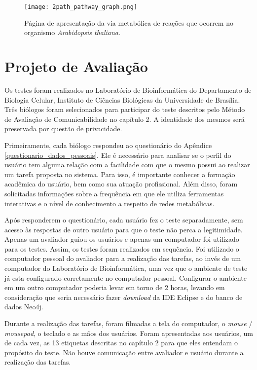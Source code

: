 \begin{figure}[!h]
    \centering
    \texttt{[image: 2path\_pathway\_graph.png]}
    \caption{Página de apresentação da via metabólica de reações que ocorrem no organismo \textit{Arabidopsis thaliana}.}
    \label{fig:2path_pathway_graph}
\end{figure}

\section{Projeto de Avaliação} \label{avaliacao}

\indent Os testes foram realizados no Laboratório de Bioinformática do Departamento de Biologia Celular, Instituto de Ciências Biológicas da Universidade de Brasília. Três biólogos foram selecionados para participar do teste descritos pelo Método de Avaliação de Comunicabilidade no capítulo 2. A identidade dos mesmos será preservada por questão de privacidade.

\indent Primeiramente, cada biólogo respondeu ao questionário do Apêndice \ref{questionario_dados_pessoais}. Ele é necessário para analisar se o perfil do usuário tem alguma relação com a facilidade com que o mesmo possui ao realizar um tarefa proposta no sistema. Para isso, é importante conhecer a formação acadêmica do usuário, bem como sua atuação profissional. Além disso, foram solicitadas informações sobre a frequência em que ele utiliza ferramentas interativas e o nível de conhecimento a respeito de redes metabólicas. 

\indent Após responderem o questionário, cada usuário fez o teste separadamente, sem acesso às respostas de outro usuário para que o teste não perca a legitimidade. Apenas um avaliador guiou os usuários e apenas um computador foi utilizado para os testes. Assim, os testes foram realizados em sequência. Foi utilizado o computador pessoal do avaliador para a realização das tarefas, ao invés de um computador do Laboratório de Bioinformática, uma vez que o ambiente de teste já esta configurado corretamente no computador pessoal. Configurar o ambiente em um outro computador poderia levar em torno de 2 horas, levando em consideração que seria necessário fazer \textit{download} da IDE Eclipse e do banco de dados Neo4j.

\indent Durante a realização das tarefas, foram filmadas a tela do computador, o \textit{mouse} / \textit{mousepad}, o teclado e as mãos dos usuários. Foram apresentadas aos usuários, um de cada vez, as 13 etiquetas descritas no capítulo 2 para que eles entendam o propósito do teste. Não houve comunicação entre avaliador e usuário durante a realização das tarefas.

